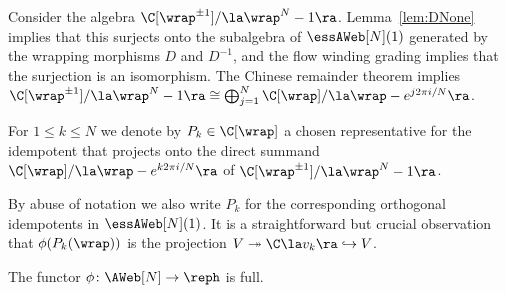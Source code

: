 Consider the algebra $\C[\wrap^{\pm 1}]/\la \wrap^N-1\ra$. Lemma~\ref{lem:DNone}
implies that this surjects onto the subalgebra of $\essAWeb[N](1)$ generated by
the wrapping morphisms $D$ and $D^{-1}$, and the flow winding grading implies that the surjection is an
isomorphism. The Chinese remainder theorem implies $\C[\wrap^{\pm 1}]/\la
\wrap^N-1\ra\cong \bigoplus_{j=1}^N \C[\wrap]/\la \wrap-e^{j 2 \pi i /N}\ra$.

\begin{defi} \label{def:Pk} For $1\leq k\leq N$ we denote by $P_k\in
\C[\wrap]$ a chosen representative for the idempotent that projects onto the
direct summand $\C[\wrap]/\la \wrap-e^{k 2 \pi i /N}\ra$ of $\C[\wrap^{\pm
1}]/\la \wrap^N-1\ra$.
\end{defi}
By abuse of notation we also write $P_k$ for the corresponding orthogonal idempotents in
$\essAWeb[N](1)$. It is a straightforward but crucial observation that
$\phi(P_k(\wrap))$ is the projection $V\twoheadrightarrow \C\la v_k\ra
\hookrightarrow V$. 


\begin{theo} \label{thm:fullness}
  The functor $\phi\colon \AWeb[N]\to \reph$ is full. 
\end{theo}


